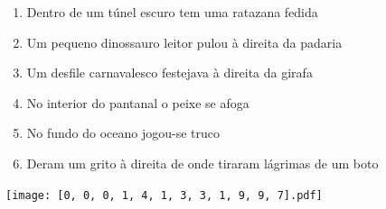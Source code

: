 \documentclass[12pt]{article}
\begin{document}
		 

\pagebreak


	\begin{enumerate}
		  \sffamily %
		  \large %


\vfill \item
Dentro de um túnel escuro	%
tem uma ratazana fedida	%

\vfill \item
Um pequeno dinossauro leitor pulou	%
à direita
da padaria	%

\vfill \item
Um desfile carnavalesco festejava	%
à direita
da girafa	%

\vfill \item
No interior do pantanal	%
o peixe se afoga	%

\vfill \item
No fundo do oceano	%
jogou-se truco	%

\vfill \item
Deram um grito	%
à direita
de onde tiraram lágrimas de um boto	%
	\end{enumerate}
		  
		  \hfill

		  \vfill

\texttt{[image: [0, 0, 0, 1, 4, 1, 3, 3, 1, 9, 9, 7].pdf]}


	\hfill	  	  


\pagebreak			
\end{document}
